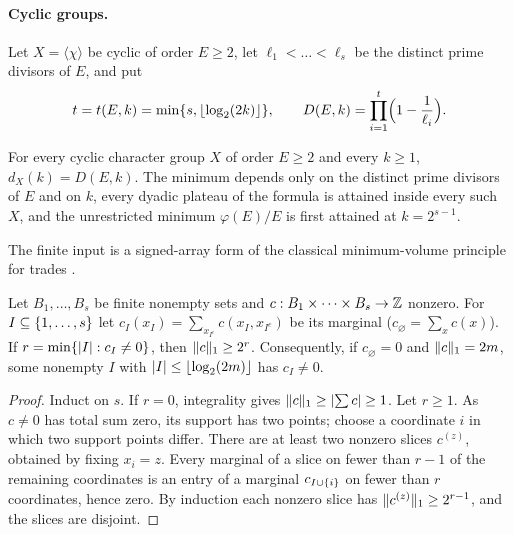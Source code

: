 \paragraph{Cyclic groups.}
Let $X=\langle\chi\rangle$ be cyclic of order $E\ge2$, let $\ell_1<\dots<\ell_s$ be the distinct prime divisors of $E$, and put
\[
 t=t(E,k)=\min\{s,\lfloor\log_2(2k)\rfloor\},\qquad D(E,k)=\prod_{i=1}^t\Bigl(1-\frac1{\ell_i}\Bigr).
\]

\begin{theorem}\label{rec:thm:cyclic}
For every cyclic character group $X$ of order $E\ge2$ and every $k\ge1$, $d_X(k)=D(E,k)$. The minimum depends
only on the distinct prime divisors of $E$ and on $k$, every dyadic plateau of the formula is attained
inside every such $X$, and the unrestricted minimum $\varphi(E)/E$ is first attained at $k=2^{s-1}$.
\end{theorem}

The finite input is a signed-array form of the classical minimum-volume principle for trades
\cite{GhorbaniKamaliKhosrovshahiKrotov2020Volumes}.

\begin{lemma}\label{rec:lem:cmarginal}
Let $B_1,\dots,B_s$ be finite nonempty sets and $c:B_1\times\dots\times B_s\to\mathbb{Z}$ nonzero. For $I\subseteq\{1,\dots,s\}$ let
$c_I(x_I)=\sum_{x_{I^c}}c(x_I,x_{I^c})$ be its marginal ($c_\varnothing=\sum_xc(x)$). If $r=\min\{\lvert I\rvert:c_I\ne0\}$, then $\lVert c\rVert_1\ge2^r$.
Consequently, if $c_\varnothing=0$ and $\lVert c\rVert_1=2m$, some nonempty $I$ with $\lvert I\rvert\le\lfloor\log_2(2m)\rfloor$ has $c_I\ne0$.
\end{lemma}

\begin{proof}
Induct on $s$. If $r=0$, integrality gives $\lVert c\rVert_1\ge\lvert\sum c\rvert\ge1$. Let $r\ge1$. As $c\ne0$ has total sum zero,
its support has two points; choose a coordinate $i$ in which two support points differ. There are at
least two nonzero slices $c^{(z)}$, obtained by fixing $x_i=z$. Every marginal of a slice on fewer than $r-1$ of
the remaining coordinates is an entry of a marginal $c_{I\cup\{i\}}$ on fewer than $r$ coordinates, hence zero.
By induction each nonzero slice has $\lVert c^{(z)}\rVert_1\ge2^{r-1}$, and the slices are disjoint.
\end{proof}

